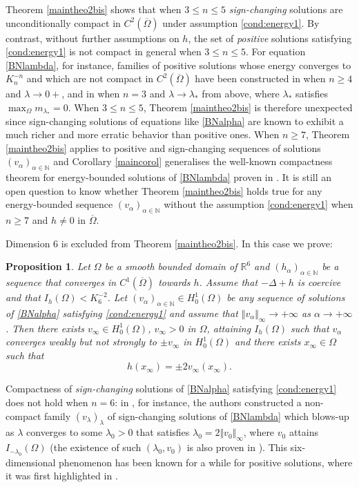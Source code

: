 \documentclass[10pt]{amsart}
\numberwithin{equation}{section}
\newcommand{\Om}{\Omega}
\def \rr {\mathbb{R}}
\def\la{\alpha}
\def \va{v_{\alpha}}
\def \ha{h_{\alpha}}
\def \nn{\mathbb{N}}
\theoremstyle{plain}
\newtheorem{prop}{Proposition}[section]%
\theoremstyle{remark}
\begin{document}
Theorem \ref{maintheo2bis} shows that when $3 \le n \le 5$ \emph{sign-changing} solutions are unconditionally compact in $C^2(\overline{\Om})$ under assumption \eqref{cond:energy1}. By contrast, without further assumptions on $h$, the set of \emph{positive} solutions satisfying \eqref{cond:energy1} is not compact in general when $3 \le n \le 5$. For equation \eqref{BNlambda}, for instance, families of positive solutions whose energy converges to $K_n^{-n}$ and which are not compact in $C^2(\overline{\Om})$  have been constructed in \cite{MussoPistoia2, Rey} when $n \ge 4$ and $\lambda \to 0+$, and in \cite{DelPinoDolbeaultMusso} when $n=3$ and $\lambda \to \lambda_*$ from above, where  $\lambda_*$ satisfies $\max_\Om m_{\lambda_*} = 0$. When $3 \le n \le 5$, Theorem \ref{maintheo2bis} is therefore unexpected since sign-changing solutions of equations like \eqref{BNalpha} are known to exhibit a much richer and more erratic behavior than positive ones. When $n \ge 7$, Theorem \ref{maintheo2bis} applies to positive and sign-changing sequences of solutions $(\va)_{\alpha \in \mathbb{N}}$ and Corollary \ref{maincorol} generalises the well-known compactness theorem for energy-bounded solutions of \eqref{BNlambda} proven in \cite{DevillanovaSolimini}. It is still an open question to know whether Theorem \ref{maintheo2bis} holds true for any energy-bounded sequence $(\va)_{\la \in \nn}$ without the assumption \eqref{cond:energy1} when $n \ge 7$ and $h \neq 0$ in $\overline{\Om}$.


\medskip


Dimension $6$ is excluded from Theorem \ref{maintheo2bis}. In this case we prove: 
\begin{prop} \label{prop:cas6}
Let $\Om$ be a smooth bounded domain of $\rr^6$ and $(\ha)_{\alpha\in\nn}$ be a sequence that converges in $C^{1}(\overline{\Om})$ towards $h$. Assume that $-\Delta+h$ is coercive and that $I_{h}(\Om)<K_{6}^{-2}$. Let   $(\va)_{\alpha\in \nn}\in H_0^1(\Om)$ be any sequence of solutions of \eqref{BNalpha} satisfying \eqref{cond:energy1} and assume that $\Vert v_\alpha \Vert_{\infty} \to +\infty$ as $ \alpha \to + \infty$. Then there exists $v_\infty \in H^1_0(\Om)$, $v_\infty >0$ in $\Om$, attaining $I_{h}(\Om)$ such that $v_\alpha$ converges weakly but not strongly to $ \pm v_\infty$ in $H^1_0(\Om)$ and there exists $x_\infty \in \Om$ such that 
$$h(x_\infty) = \pm   2v_\infty(x_\infty).$$ 
\end{prop}
Compactness of \emph{sign-changing} solutions of \eqref{BNalpha} satisfying \eqref{cond:energy1} does not hold when $n=6$: in \cite{PistoiaVairadim6}, for instance, the authors constructed a non-compact family $(v_\lambda)_\lambda$ of sign-changing solutions of \eqref{BNlambda} which blows-up as $\lambda$ converges to some $\lambda_0 >0$ that satisfies $\lambda_0 = 2 \Vert v_{0} \Vert_{\infty}$, where $v_0$ attains $I_{- \lambda_0}(\Om)$ (the existence of such $(\lambda_0, v_0)$ is also proven in \cite{PistoiaVairadim6}). This six-dimensional phenomenon has been known for a while for positive solutions, where it was first highlighted in \cite{DruetYlowdim}. 
\end{document}
